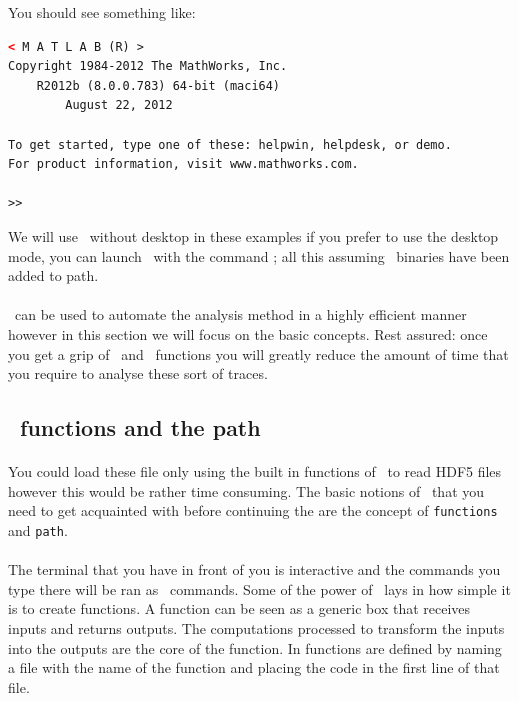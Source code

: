 You should see something like:
\begin{lstlisting}[numbers=none,language=xml]
		< M A T L A B (R) >
Copyright 1984-2012 The MathWorks, Inc.
	R2012b (8.0.0.783) 64-bit (maci64)
		August 22, 2012

To get started, type one of these: helpwin, helpdesk, or demo.
For product information, visit www.mathworks.com.
 
>> 
\end{lstlisting}

We will use \matlab\ without desktop in these examples if you prefer to use the desktop mode, you can launch \matlab\ with the command ; all this assuming \matlab\ binaries have been added to path.

\paragraph{}
\matlab\ can be used to automate the analysis method in a highly efficient manner however in this section we will focus on the basic concepts. Rest assured: once you get a grip of \matlab\ and \matlab\ functions you will greatly reduce the amount of time that you require to analyse these sort of traces.

\subsection{\matlab\ functions and the path}
\paragraph{}
You could load these file only using the built in functions of \matlab\ to read HDF5 files however this would be rather time consuming. The basic notions of \matlab\ that you need to get acquainted with before continuing the are the concept of \texttt{functions} and \texttt{path}.
\paragraph{}
The terminal that you have in front of you is interactive and the commands you type there will be ran as \matlab\ commands. Some of the power of \matlab\ lays in how simple it is to create functions. A function can be seen as a generic box that receives inputs and returns outputs. The computations processed to transform the inputs into the outputs are the core of the function. In \matlab functions are defined by naming a file with the name of the function and placing the code  in the first line of that file.

